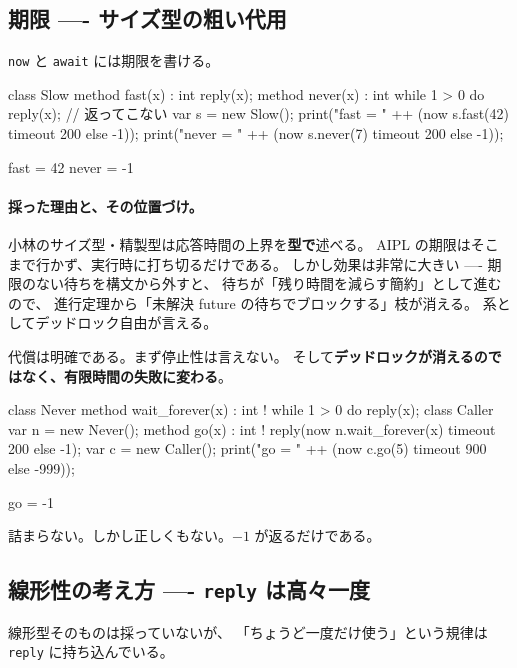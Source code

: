 \documentclass[11pt,a4paper]{ltjsarticle}
\theoremstyle{definition}
\theoremstyle{remark}
\begin{document}
\subsection{期限 ---- サイズ型の粗い代用}

\texttt{now} と \texttt{await} には期限を書ける。

\begin{aipl}
class Slow {
  method fast(x) : int { reply(x); }
  method never(x) : int { while 1 > 0 do { } reply(x); }   // 返ってこない
}
var s = new Slow();
print("fast  = " ++ (now s.fast(42) timeout 200 else -1));
print("never = " ++ (now s.never(7) timeout 200 else -1));
\end{aipl}
\begin{term}
fast  = 42
never = -1
\end{term}

\paragraph{採った理由と、その位置づけ。}
小林のサイズ型・精製型は応答時間の上界を\textbf{型で}述べる。
AIPL の期限はそこまで行かず、実行時に打ち切るだけである。
しかし効果は非常に大きい ---- 期限のない待ちを構文から外すと、
待ちが「残り時間を減らす簡約」として進むので、
進行定理から「未解決 future の待ちでブロックする」枝が消える。
系としてデッドロック自由が言える。

代償は明確である。まず停止性は言えない。
そして\textbf{デッドロックが消えるのではなく、有限時間の失敗に変わる}。

\begin{aipl}
class Never  { method wait_forever(x) : int !{} { while 1 > 0 do { } reply(x); } }
class Caller {
  var n = new Never();
  method go(x) : int !{} { reply(now n.wait_forever(x) timeout 200 else -1); }
}
var c = new Caller();
print("go = " ++ (now c.go(5) timeout 900 else -999));
\end{aipl}
\begin{term}
go = -1
\end{term}

詰まらない。しかし正しくもない。$-1$ が返るだけである。

\subsection{線形性の考え方 ---- \texttt{reply} は高々一度}

線形型そのものは採っていないが、
「ちょうど一度だけ使う」という規律は \texttt{reply} に持ち込んでいる。
\end{document}

